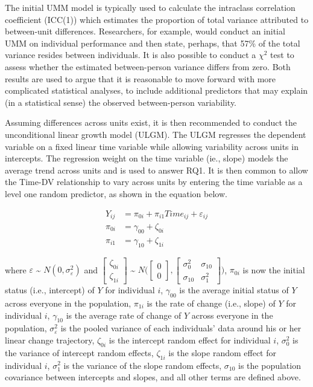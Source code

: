 \documentclass[english,,man]{apa6}
\begin{document}
The initial UMM model is typically used to calculate the intraclass correlation coefficient (ICC(1)) which estimates the proportion of total variance attributed to between-unit differences. Researchers, for example, would conduct an initial UMM on individual performance and then state, perhaps, that 57\% of the total variance resides between individuals. It is also possible to conduct a \(\chi^2\) test to assess whether the estimated between-person variance differs from zero. Both results are used to argue that it is reasonable to move forward with more complicated statistical analyses, to include additional predictors that may explain (in a statistical sense) the observed between-person variability.

Assuming differences across units exist, it is then recommended to conduct the unconditional linear growth model (ULGM). The ULGM regresses the dependent variable on a fixed linear time variable while allowing variability across units in intercepts. The regression weight on the time variable (ie., slope) models the average trend across units and is used to answer RQ1. It is then common to allow the Time-DV relationship to vary across units by entering the time variable as a level one random predictor, as shown in the equation below.

\begin{align}
\label{ULGM}
Y_{ij} &= \pi_{0i} + \pi_{i1}Time_{ij} + \varepsilon_{ij} \\
\pi_{0i} &= \gamma_{00} + \zeta_{0i} \\
\pi_{i1} &= \gamma_{10} + \zeta_{1i}
\end{align}

\noindent \noindent where \(\varepsilon\) \textasciitilde{} \(N(0, \sigma_{\varepsilon}^2)\) and \(\begin{bmatrix} \zeta_{0i} \\ \zeta_{1i} \end{bmatrix}\) \textasciitilde{} \(N\bigl(\begin{bmatrix} 0 \\ 0 \end{bmatrix}, \begin{bmatrix} \sigma_{0}^2 & \sigma_{10} \\ \sigma_{10} & \sigma_{1}^2\end{bmatrix}\bigr)\), \(\pi_{0i}\) is now the initial status (i.e., intercept) of \(Y\) for individual \(i\), \(\gamma_{00}\) is the average initial status of \(Y\) across everyone in the population, \(\pi_{1i}\) is the rate of change (i.e., slope) of \(Y\) for individual \(i\), \(\gamma_{10}\) is the average rate of change of \(Y\) across everyone in the population, \(\sigma_{\varepsilon}^2\) is the pooled variance of each individuals' data around his or her linear change trajectory, \(\zeta_{0i}\) is the intercept random effect for individual \(i\), \(\sigma_{0}^2\) is the variance of intercept random effects, \(\zeta_{1i}\) is the slope random effect for individual \(i\), \(\sigma_1^2\) is the variance of the slope random effects, \(\sigma_{10}\) is the population covariance between intercepts and slopes, and all other terms are defined above.
\end{document}
